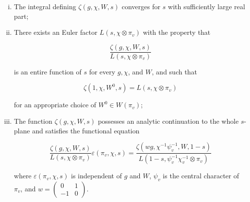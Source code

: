 \begin{theorem}\label{thm:6.12}

\begin{enumerate}[(i)]

\item The integral defining $\zeta(g, \chi, W, s)$ converges for $s$ with sufficiently large real part;

\item There exists an Euler factor $L(s, \chi \otimes \pi_v)$ with the property that

\[
\frac{\zeta(g, \chi, W, s)}{L(s, \chi \otimes \pi_v)}
\]

is an entire function of $s$ for every $g, \chi$, and $W$, and such that

\begin{equation}\label{eq:6.29}
\zeta(1, \chi, W^0, s) = L(s, \chi \otimes \pi_v)\tag{6.29}
\end{equation}

for an appropriate choice of $W^0 \in W(\pi_v)$;

\item The function $\zeta(g, \chi, W, s)$ possesses an analytic continuation to the whole $s$-plane and satisfies the functional equation

\begin{equation}\label{eq:6.30}
\frac{\zeta(g, \chi, W, s)}{L(s, \chi \otimes \pi_v)} \varepsilon(\pi_v, \chi, s) = \frac{\zeta(wg, \chi^{-1}\psi_v^{-1}, W, 1 - s)}{L(1 - s, \psi_v^{-1}\chi_v^{-1} \otimes \pi_v)}\tag{6.30}
\end{equation}

where $\varepsilon(\pi_v, \chi, s)$ is independent of $g$ and $W$, $\psi_v$ is the central character of $\pi_v$, and $w = \begin{pmatrix} 0 & 1 \\ -1 & 0 \end{pmatrix}$.

\end{enumerate}

\end{theorem}

